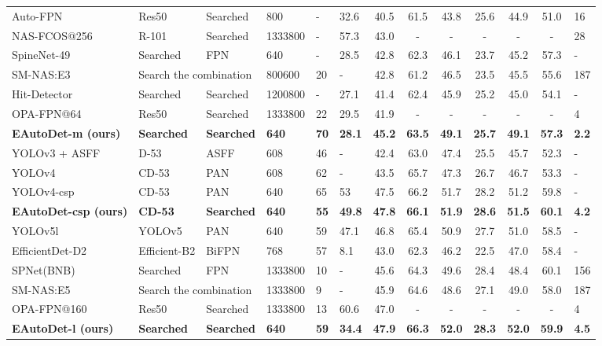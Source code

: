 \documentclass[letterpaper]{article} \usepackage{aaai22}  \usepackage{times}  \usepackage{helvet}  \usepackage{courier}  \usepackage[hyphens]{url}  \usepackage{graphicx} \urlstyle{rm} \def\UrlFont{\rm}  \usepackage{natbib}  \usepackage{caption} \DeclareCaptionStyle{ruled}{labelfont=normalfont,labelsep=colon,strut=off} \frenchspacing  \setlength{\pdfpagewidth}{8.5in}  \setlength{\pdfpageheight}{11in}
\begin{document}
\begin{table*}[tb!]
{\begin{tabular}{llllll c c c c c c l}
Auto-FPN~\citeyearpar{autofpn} & Res50& Searched  &800 &- & 32.6 &40.5 & 61.5 & 43.8 & 25.6 & 44.9 & 51.0 & 16 \\  
NAS-FCOS@256~\citeyearpar{wang2020fcos}&R-101& Searched &1333800&- & 57.3 &43.0 &- & -& -& -& - & 28\\
SpineNet-49~\citeyearpar{du2020spinenet}&Searched& FPN &640&- & 28.5 &42.8 &62.3 &46.1 &23.7 &45.2 &57.3 & - \\
SM-NAS:E3~\citeyearpar{yao2020sm}& \multicolumn{2}{H}{Search the combination} &800600& 20 & - &42.8 &61.2 &46.5 &23.5 &45.5 &55.6 & 187 \\
Hit-Detector~\citeyearpar{hit_detector} & Searched & Searched & 1200800 & - & 27.1 & 41.4 & 62.4 & 45.9 & 25.2 & 45.0 & 54.1 & - \\
OPA-FPN@64~\citeyearpar{liang2021opanas}&Res50& Searched &1333800&22 & 29.5 &41.9 & -& -& -& -& - & 4\\
\textbf{EAutoDet-m (ours)}  &  \textbf{Searched}& \textbf{Searched}  &   \textbf{640}  &   \textbf{70} & \textbf{28.1}   & \textbf{45.2}        &  \textbf{63.5}       & \textbf{49.1}        &    \textbf{25.7}     &  \textbf{49.1}       & \textbf{57.3}  & \textbf{2.2}      \\    
\midrule
YOLOv3 + ASFF~\citeyearpar{liu2019learning}  & D-53 & ASFF     & 608 & 46 & - & 42.4 & 63.0 & 47.4 & 25.5 & 45.7 & 52.3 & - \\
YOLOv4~\citeyearpar{bochkovskiy2020yolov4}     & CD-53 & PAN         & 608 & 62 & -   & 43.5 & 65.7 & 47.3 & 26.7 & 46.7 & 53.3 & - \\
YOLOv4-csp~\citeyearpar{wang2021scaled}    & CD-53& PAN  & 640 & 65 & 53  & 47.5 & 66.2 & 51.7 & 28.2 & 51.2 & 59.8 &- \\
\textbf{EAutoDet-csp (ours)}    & \textbf{CD-53}& \textbf{Searched}  & \textbf{640} & \textbf{55}  & \textbf{49.8} & \textbf{47.8} & \textbf{66.1} & \textbf{51.9} & \textbf{28.6} & \textbf{51.5} & \textbf{60.1} & \textbf{4.2} \\
YOLOv5l~\citeyearpar{yolov5}         &   YOLOv5     & PAN              & 640 & 59 & 47.1 & 46.8 & 65.4 &    50.9   &  27.7     & 51.0   &  58.5 & -    \\
EfficientDet-D2~\citeyearpar{tan2020efficientdet} & Efficient-B2 & BiFPN   & 768 & 57 & 8.1 & 43.0 & 62.3 & 46.2 & 22.5 & 47.0 & 58.4 &- \\
SPNet(BNB)~\citeyearpar{jiang2020sp}&Searched& FPN &1333800&10 & - &45.6 &64.3 &49.6 &28.4 &48.4 &60.1 & 156 \\
SM-NAS:E5~\citeyearpar{yao2020sm}& \multicolumn{2}{H}{Search the combination} &1333800& 9 & - &45.9 &64.6 &48.6 &27.1 &49.0 &58.0 & 187 \\
OPA-FPN@160~\citeyearpar{liang2021opanas}&Res50& Searched &1333800&13 & 60.6 &47.0 & -& -& -& -& - & 4 \\
\textbf{EAutoDet-l (ours)}  & \textbf{Searched}& \textbf{Searched}   &  \textbf{640}   &  \textbf{59} & \textbf{34.4}   & \textbf{47.9}        &  \textbf{66.3}       &     \textbf{52.0}    &    \textbf{28.3}     &  \textbf{52.0}       & \textbf{59.9}   & \textbf{4.5}      \\    


\end{tabular}}
\end{table*}
\end{document}
